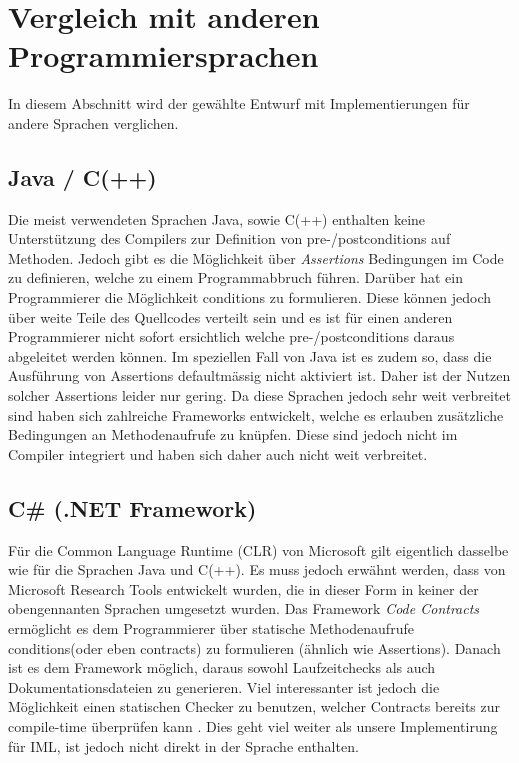 \section{Vergleich mit anderen Programmiersprachen}
In diesem Abschnitt wird der gewählte Entwurf mit Implementierungen
für andere Sprachen verglichen.

\subsection{Java / C(++)}
Die meist verwendeten Sprachen Java, sowie C(++) enthalten keine Unterstützung des Compilers 
zur Definition von pre-/postconditions auf Methoden. Jedoch gibt es die Möglichkeit 
über \textit{Assertions} Bedingungen im Code zu definieren, welche zu einem Programmabbruch führen.
Darüber hat ein Programmierer die Möglichkeit conditions zu formulieren. Diese können jedoch über weite
Teile des Quellcodes verteilt sein und es ist für einen anderen Programmierer nicht 
sofort ersichtlich welche pre-/postconditions daraus abgeleitet werden können. Im speziellen 
Fall von Java ist es zudem so, dass die Ausführung von Assertions defaultmässig nicht aktiviert 
ist. Daher ist der Nutzen solcher Assertions leider nur gering. Da diese Sprachen jedoch 
sehr weit verbreitet sind haben sich zahlreiche Frameworks entwickelt, welche es erlauben
zusätzliche Bedingungen an Methodenaufrufe zu knüpfen. Diese sind jedoch nicht im Compiler integriert
und haben sich daher auch nicht weit verbreitet.

\subsection{C\# (.NET Framework)}

Für die Common Language Runtime (CLR) von Microsoft gilt eigentlich dasselbe wie für die Sprachen 
Java und C(++). Es muss jedoch erwähnt werden, dass von Microsoft Research Tools entwickelt wurden, 
die in dieser Form in keiner der obengennanten Sprachen umgesetzt wurden. Das Framework 
\textit{Code Contracts} ermöglicht es dem Programmierer über statische Methodenaufrufe 
conditions(oder eben contracts) zu formulieren (ähnlich wie Assertions). 
Danach ist es dem Framework möglich, daraus sowohl Laufzeitchecks als auch 
Dokumentationsdateien zu generieren. Viel interessanter ist jedoch die Möglichkeit einen 
statischen Checker zu benutzen, welcher Contracts bereits zur compile-time überprüfen 
kann \cite{MS:StaticAnalysis}. Dies geht viel weiter als unsere Implementirung für IML, 
ist jedoch nicht direkt in der Sprache enthalten.

